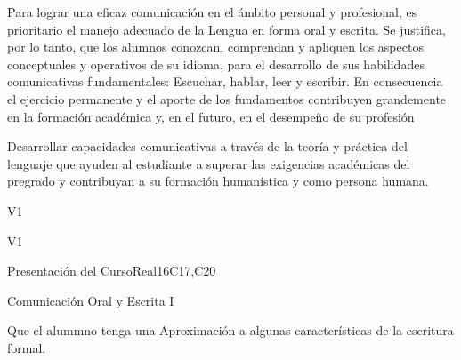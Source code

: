 \begin{syllabus}


\begin{justification}
Para lograr una eficaz comunicación en el ámbito personal y profesional, es prioritario el manejo adecuado de la Lengua en forma oral y escrita. Se justifica, por lo tanto, que los alumnos  conozcan, comprendan y apliquen los aspectos conceptuales y operativos de su idioma, para el desarrollo de sus habilidades comunicativas fundamentales: Escuchar, hablar, leer y escribir.
En consecuencia el ejercicio permanente y el aporte de los fundamentos contribuyen grandemente en la formación académica y, en el futuro, en el desempeño de su profesión
\end{justification}

\begin{goals}
\item Desarrollar capacidades comunicativas a través de la teoría y práctica del lenguaje que ayuden al estudiante a superar las exigencias académicas del pregrado y contribuyan a su formación humanística y como persona humana.
\end{goals}

\begin{outcomes}{V1}
   \item {}
   \item {}
   \item {}
\end{outcomes}

\begin{competences}{V1}
    \item {}
    \item {}
    \item {}
\end{competences}

\begin{unit}{Presentación del Curso}{}{Real}{16}{C17,C20}
  \begin{topics}
      \item Comunicación Oral y Escrita I
  \end{topics}

  \begin{learningoutcomes}
   \item Que el alummno tenga una Aproximación a algunas características de la escritura formal.
  \end{learningoutcomes}
\end{unit}


\end{syllabus}

